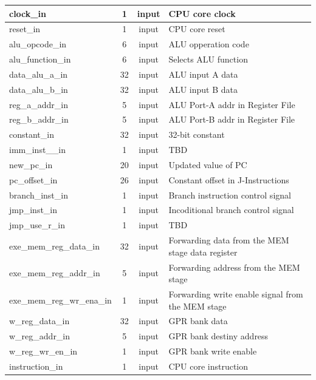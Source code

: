 \documentclass{article}
\begin{document}
\begin{center}
\begin{longtable}[pos]{| l | c | c | m{7cm} |}
        clock\_in               & 1  & input  & CPU core clock    \\ \hline
        reset\_in               & 1  & input  & CPU core reset    \\ \hline
        alu\_opcode\_in         & 6  & input  & ALU opperation code  \\ \hline
        alu\_function\_in       & 6  & input  & Selects ALU function \\ \hline
        data\_alu\_a\_in        & 32 & input  & ALU input A data  \\ \hline
        data\_alu\_b\_in        & 32 & input  & ALU input B data  \\ \hline
        reg\_a\_addr\_in        & 5  & input  & ALU Port-A addr in Register File  \\ \hline
        reg\_b\_addr\_in        & 5  & input  & ALU Port-B addr in Register File  \\ \hline
        constant\_in            & 32 & input  & 32-bit constant  \\ \hline
        imm\_inst\_\_in         & 1  & input  & TBD \\ \hline  
        new\_pc\_in             & 20 & input  & Updated value of PC  \\ \hline 
        pc\_offset\_in          & 26 & input  & Constant offset in J-Instructions  \\ \hline 
        branch\_inst\_in        & 1  & input  & Branch instruction control signal \\ \hline        
        jmp\_inst\_in           & 1  & input  & Incoditional branch control signal \\ \hline        
        jmp\_use\_r\_in         & 1  & input  & TBD \\ \hline
        exe\_mem\_reg\_data\_in & 32 & input  & Forwarding data from the MEM stage data register \\ \hline
        exe\_mem\_reg\_addr\_in & 5  & input  & Forwarding address from the MEM stage \\ \hline
        exe\_mem\_reg\_wr\_ena\_in & 1 & input  & Forwarding write enable signal from the MEM stage \\ \hline        
        w\_reg\_data\_in        & 32  & input  & GPR bank data \\ \hline 
        w\_reg\_addr\_in        & 5   & input  & GPR bank destiny address \\ \hline 
        w\_reg\_wr\_en\_in      & 1   & input  & GPR bank write enable \\ \hline 
        instruction\_in         & 1   & input  & CPU core instruction \\ \hline
        

\end{longtable}
\end{center}
\end{document}
